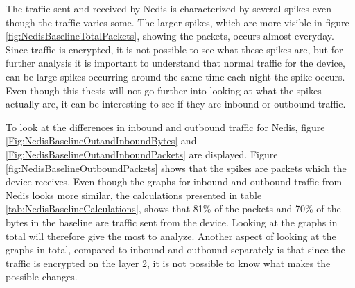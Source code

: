 The traffic sent and received by Nedis is characterized by several spikes even though the traffic varies some. The larger spikes, which are more visible in figure \ref{fig:NedisBaselineTotalPackets}, showing the packets, occurs almost everyday. Since traffic is encrypted, it is not possible to see what these spikes are, but for further analysis it is important to understand that normal traffic for the device, can be large spikes occurring around the same time each night the spike occurs. Even though this thesis will not go further into looking at what the spikes actually are, it can be interesting to see if they are inbound or outbound traffic. 

To look at the differences in inbound and outbound traffic for Nedis, figure \ref{Fig:NedisBaselineOutandInboundBytes} and \ref{Fig:NedisBaselineOutandInboundPackets} are displayed. Figure \ref{fig:NedisBaselineOutboundPackets} shows that the spikes are packets which the device receives.
Even though the graphs for inbound and outbound traffic from Nedis looks more similar, the calculations presented in table \ref{tab:NedisBaselineCalculations}, shows that 81\% of the packets and 70\% of the bytes in the baseline are traffic sent from the device. Looking at the graphs in total will therefore give the most to analyze. Another aspect of looking at the graphs in total, compared to inbound and outbound separately is that since the traffic is encrypted on the layer 2, it is not possible to know what makes the possible changes. 


